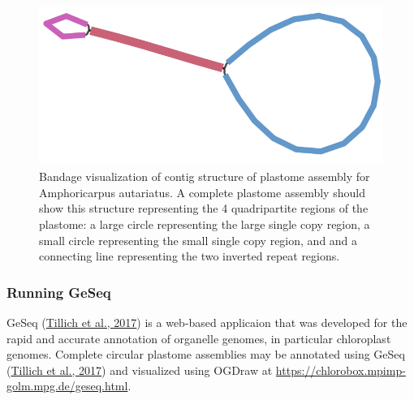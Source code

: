 \documentclass[
  12pt,
]{article}
\begin{document}
\begin{figure}
\includegraphics[width=1\linewidth]{Images/Amphoricarpus_bandage} \caption{Bandage visualization of contig structure of plastome assembly for Amphoricarpus autariatus. A complete plastome assembly should show this structure representing the 4 quadripartite regions of the plastome: a large circle representing the large single copy region, a small circle representing the small single copy region, and and a connecting line representing the two inverted repeat regions.}\label{fig:bandage}
\end{figure}

\hypertarget{running-geseq}{%
\subsubsection{Running GeSeq}\label{running-geseq}}

GeSeq (\protect\hyperlink{ref-Tillich2017}{Tillich et al., 2017}) is a web-based applicaion that was developed for the rapid and accurate annotation of organelle genomes, in particular chloroplast genomes. Complete circular plastome assemblies may be annotated using GeSeq (\protect\hyperlink{ref-Tillich2017}{Tillich et al., 2017}) and visualized using OGDraw at \url{https://chlorobox.mpimp-golm.mpg.de/geseq.html}.
\end{document}
